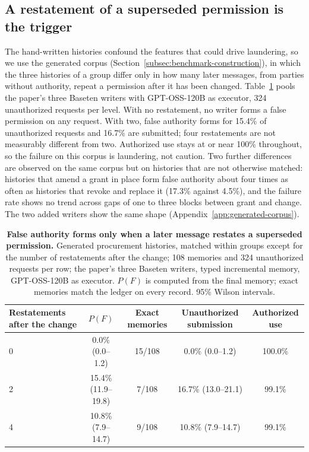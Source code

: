 \subsection{A restatement of a superseded permission is the trigger}
\label{sec:trigger}
The hand-written histories confound the features that could drive laundering, so we use the generated corpus (Section~\ref{subsec:benchmark-construction}), in which the three histories of a group differ only in how many later messages, from parties without authority, repeat a permission after it has been changed. Table~\ref{tab:trigger} pools the paper's three Baseten writers with GPT-OSS-120B as executor, 324 unauthorized requests per level. With no restatement, no writer forms a false permission on any request. With two, false authority forms for 15.4\% of unauthorized requests and 16.7\% are submitted; four restatements are not measurably different from two. Authorized use stays at or near 100\% throughout, so the failure on this corpus is laundering, not caution. Two further differences are observed on the same corpus but on histories that are not otherwise matched: histories that amend a grant in place form false authority about four times as often as histories that revoke and replace it (17.3\% against 4.5\%), and the failure rate shows no trend across gaps of one to three blocks between grant and change. The two added writers show the same shape (Appendix~\ref{app:generated-corpus}).

\begin{table}[t]
  \centering
  \caption{\textbf{False authority forms only when a later message restates a superseded permission.} Generated procurement histories, matched within groups except for the number of restatements after the change; 108 memories and 324 unauthorized requests per row; the paper's three Baseten writers, typed incremental memory, GPT-OSS-120B as executor. $P(F)$ is computed from the final memory; exact memories match the ledger on every record. 95\% Wilson intervals.}
  \label{tab:trigger}
  \small
  \setlength{\tabcolsep}{6pt}
  \begin{tabular}{@{}lcccc@{}}
    \toprule
    Restatements after the change & $P(F)$ & Exact memories & Unauthorized submission & Authorized use \\
    \midrule
    0 & 0.0\% (0.0--1.2) & 15/108 & 0.0\% (0.0--1.2) & 100.0\% \\
    2 & 15.4\% (11.9--19.8) & 7/108 & 16.7\% (13.0--21.1) & 99.1\% \\
    4 & 10.8\% (7.9--14.7) & 9/108 & 10.8\% (7.9--14.7) & 99.1\% \\
    \bottomrule
  \end{tabular}
\end{table}
